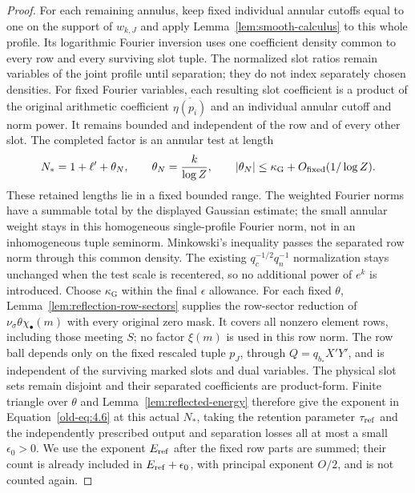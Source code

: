 \documentclass[11pt,a4paper]{article}
\numberwithin{equation}{section}
\numberwithin{figure}{section}
\theoremstyle{definition}
\theoremstyle{remark}
\begin{document}
\begin{proof}
For each remaining annulus, keep fixed individual annular cutoffs equal to
one on the support of $w_{k,J}$ and apply
Lemma~\ref{lem:smooth-calculus} to this whole profile.  Its logarithmic
Fourier inversion uses one coefficient density common to every row and
every surviving slot tuple.  The normalized slot ratios remain variables
of the joint profile until separation; they do not index separately
chosen densities.  For fixed Fourier variables, each resulting slot
coefficient is a product of the
original arithmetic coefficient $\overline{\eta(p_i)}$ and an individual
annular cutoff and norm power.  It remains bounded and independent of the
row and of every other slot.  The completed factor is an annular test at
length
\[
 N_*=1+\ell'+\theta_N,\qquad
 \theta_N=\frac{k}{\log Z},\qquad
 |\theta_N|\le\kappa_{\mathrm G}+O_{\rm fixed}(1/\log Z).
\]
These retained lengths lie in a fixed bounded range.  The weighted Fourier
norms have a summable total by the displayed Gaussian estimate; the small
annular weight stays in this homogeneous single-profile Fourier norm, not
in an inhomogeneous tuple seminorm.  Minkowski's inequality passes the
separated row norm through this common density.  The existing $q_c^{-1/2}q_n^{-1}$
normalization stays unchanged when the test scale is recentered, so no
additional power of $e^k$ is introduced.  Choose $\kappa_{\mathrm G}$
within the final $\epsilon$ allowance.  For each fixed $\theta$,
Lemma~\ref{lem:reflection-row-sectors} supplies the row-sector reduction of
$\nu_\sigma\theta\chi_\bullet(m)$ with every original zero mask.  It covers
all nonzero element rows, including those meeting $S$; no factor $\xi(m)$ is
used in this row norm.  The row ball depends only on the fixed rescaled tuple
$p_J$, through $Q=q_{b_*}X'Y'$, and is independent of the surviving marked
slots and dual variables.  The physical slot sets remain disjoint and their
separated coefficients are product-form.  Finite triangle over $\theta$ and
Lemma~\ref{lem:reflected-energy} therefore give the exponent in
Equation~\eqref{old-eq:4.6} at this actual $N_*$, taking the retention
parameter $\tau_{\rm ref}$ and the independently prescribed output
and separation losses all at most a small $\epsilon_0>0$.  We use
the exponent $E_{\rm ref}$ after the fixed row parts are summed;
their count is already included in $E_{\rm ref}+\epsilon_0$, with
principal exponent $O/2$, and is not counted again.


\end{proof}
\end{document}
